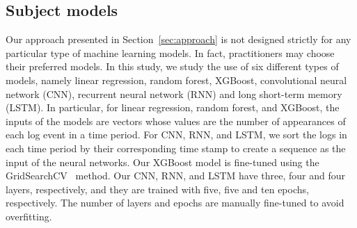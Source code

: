 \subsection{Subject models}
Our approach presented in Section~\ref{sec:approach} is not designed strictly for any particular type of machine learning models. In fact, practitioners may choose their preferred models. In this study, we study the use of six different types of models, namely linear regression, random forest, XGBoost, convolutional neural network (CNN), recurrent neural network (RNN) and long short-term memory (LSTM). In particular, for linear regression, random forest, and XGBoost, the inputs of the models are vectors whose values are the number of appearances of each log event in a time period. For CNN, RNN, and LSTM, we sort the logs in each time period by their corresponding time stamp to create a sequence as the input of the neural networks. Our XGBoost model is fine-tuned using the GridSearchCV~\citep{girdsearcv} method. Our CNN, RNN, and LSTM have three, four and four layers, respectively, and they are trained with five, five and ten epochs, respectively. The number of layers and epochs are manually fine-tuned to avoid overfitting.
